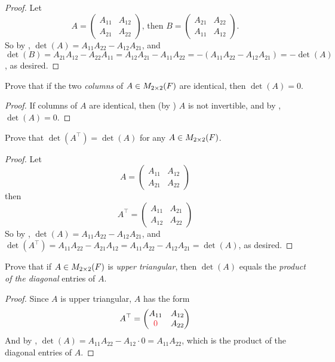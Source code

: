 \begin{proof}
Let
\[
    A = \begin{pmatrix} A_{11} & A_{12} \\ A_{21} & A_{22} \end{pmatrix}
    \text{, then }
    B = \begin{pmatrix} A_{21} & A_{22} \\ A_{11} & A_{12} \end{pmatrix}.
\]
So by , \(\det(A) = A_{11} A_{22} - A_{12} A_{21}\), and \(\det(B) = A_{21} A_{12} - A_{22} A_{11} = A_{12} A_{21} - A_{11} A_{22} = -(A_{11} A_{22} - A_{12} A_{21}) = -\det(A)\), as desired.
\end{proof}

\begin{exercise} \label{exercise 4.1.6}
Prove that if the two \emph{columns} of \(A \in M_{2 \times 2}(F)\) are identical, then \(\det(A) = 0\).
\end{exercise}

\begin{proof}
If columns of \(A\) are identical, then (by ) \(A\) is not invertible, and by , \(\det(A) = 0\).
\end{proof}

\begin{exercise} \label{exercise 4.1.7}
Prove that \(\det(A^\top) = \det(A)\) for any \(A \in M_{2 \times 2}(F)\).
\end{exercise}

\begin{proof}
Let
\[
    A = \begin{pmatrix} A_{11} & A_{12} \\ A_{21} & A_{22} \end{pmatrix}
\]
then
\[
    A^\top = \begin{pmatrix} A_{11} & A_{21} \\ A_{12} & A_{22} \end{pmatrix}
\]
So by , \(\det(A) = A_{11} A_{22} - A_{12} A_{21}\), and \(\det(A^\top) = A_{11} A_{22} - A_{21} A_{12} = A_{11} A_{22} - A_{12} A_{21} = \det(A)\), as desired.
\end{proof}

\begin{exercise} \label{exercise 4.1.8}
Prove that if \(A \in M_{2 \times 2}(F)\) is \emph{upper triangular}, then \(\det(A)\) equals the \emph{product of the diagonal} entries of \(A\).
\end{exercise}

\begin{proof}
Since \(A\) is upper triangular, \(A\) has the form
\[
    A^\top = \begin{pmatrix} A_{11} & A_{12} \\ \RED{0} & A_{22} \end{pmatrix}
\]
And by , \(\det(A) = A_{11} A_{22} - A_{12} \cdot 0 = A_{11} A_{22}\), which is the product of the diagonal entries of \(A\).
\end{proof}

